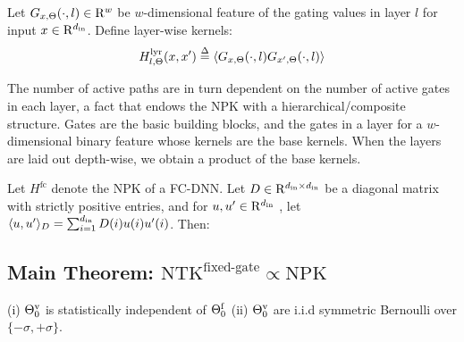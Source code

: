 %
\begin{definition}\label{def:layerkernel} Let $G_{x,\Theta}(\cdot,l)\in\mathrm{R}^w$ be $w$-dimensional feature of the gating values in layer $l$ for input $x\in\mathrm{R}^{d_{\text{in}}}$.  Define layer-wise kernels:
\begin{align*}
H^{\text{lyr}}_{l,\Theta}(x,x')\stackrel{\Delta}{=}\langle G_{x,\Theta}(\cdot,l)G_{x',\Theta}(\cdot,l)\rangle
\end{align*}
\end{definition}
The number of active paths are in turn dependent on the number of active gates in each layer, a fact that endows the NPK with a hierarchical/composite structure. Gates are the basic building blocks, and the gates in a layer for a $w$-dimensional binary feature whose kernels are the base kernels. When the layers are laid out depth-wise, we obtain a product of the base kernels. 
\begin{lemma}\label{lm:productkernel}
 Let $H^{\text{fc}}$ denote the NPK of a FC-DNN. Let $D\in\mathrm{R}^{d_{\text{in}}\times d_{\text{in}}}$ be a diagonal matrix with strictly positive entries, and for $u,u'\in\mathrm{R}^{d_{\text{in}}}$ , let $\langle u,u'\rangle_{D}=\sum_{i=1}^{d_{\text{in}}}D(i)u(i)u'(i)$. Then:
\end{lemma}
\subsection{Main Theorem: $\text{NTK}^{\text{fixed-gate}}\propto\text{NPK}$}
\begin{assumption}\label{assmp:main}
(i) ${\Theta}^{\text{v}}_0$ is statistically independent of $\Theta^{\textrm{f}}_0$ (ii) ${\Theta}^{\text{v}}_0$ are i.i.d symmetric Bernoulli over $\{-{\sigma},+{\sigma}\}$. 
\end{assumption}

